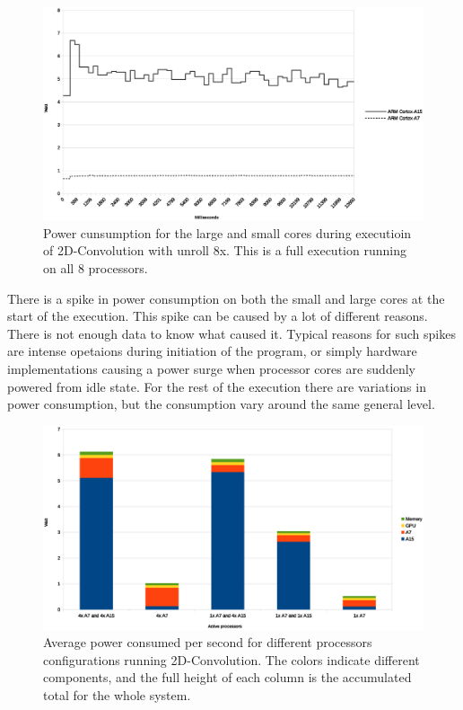 \begin{figure}[H]
  \centering
  \includegraphics[width=160mm]{fig/power-over-time.eps}
  \caption{Power cunsumption for the large and small cores during executioin of 2D-Convolution with unroll 8x. This is a full execution running on all 8 processors. \label{overflow}}\label{powerovertime}
\end{figure}
There is a spike in power consumption on both the small and large cores at the start of the execution.
This spike can be caused by a lot of different reasons.
There is not enough data to know what caused it.
Typical reasons for such spikes are intense opetaions during initiation of the program, or simply hardware implementations causing a power surge when processor cores are suddenly powered from idle state.
For the rest of the execution there are variations in power consumption, but the consumption vary around the same general level.

\begin{figure}[H]
  \centering
  \includegraphics[width=160mm]{fig/power-configurations.eps}
  \caption{Average power consumed per second for different processors configurations running 2D-Convolution. The colors indicate different components, and the full height of each column is the accumulated total for the whole system.\label{overflow}} \label{power-configurations}
\end{figure}

